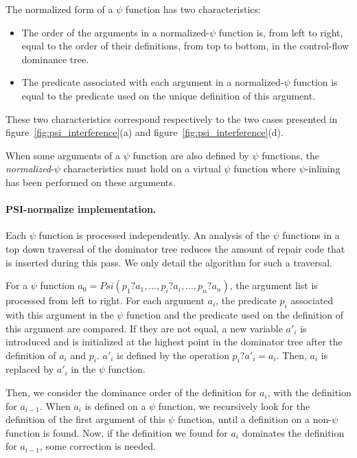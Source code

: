 The normalized form of a $\psi$ function has two characteristics:

\begin{itemize}
\item The order of the arguments in a normalized-$\psi$ function is,
from left to right, equal to the order of their definitions, from top
to bottom, in the control-flow dominance tree.
\item The predicate associated with each argument in a
normalized-$\psi$ function is equal to the predicate used on the
unique definition of this argument.
\end{itemize}

These two characteristics correspond respectively to the two cases
presented in figure~\ref{fig:psi_interference}(a) and
figure~\ref{fig:psi_interference}(d).

When some arguments of a $\psi$ function are also defined by $\psi$
functions, the {\em normalized}-$\psi$ characteristics must hold on a
virtual $\psi$ function where $\psi$-inlining has been performed on
these arguments.

\paragraph{PSI-normalize implementation.}

Each $\psi$ function is processed independently. An analysis of the
$\psi$ functions in a top down traversal of the dominator tree
reduces the amount of repair code that is inserted during this pass. We
only detail the algorithm for such a traversal.

For a $\psi$ function ${a_0 = Psi(p_1?a_1, ..., p_i?a_i, ...,
  p_n?a_n)}$, the argument list is processed from left to right. For
each argument ${a_i}$, the predicate ${p_i}$ associated with this argument
in the $\psi$ function and the predicate used on the definition of
this argument are compared. If they are not equal, a new variable
${a'_i}$ is introduced and is initialized at the highest point in the
dominator tree after the definition of ${a_i}$ and ${p_i}$. ${a'_i}$ is
defined by the operation ${p_i? a'_i = a_i}$. Then, ${a_i}$ is
replaced by ${a'_i}$ in the $\psi$ function.

Then, we consider the dominance order of the definition for ${a_i}$,
with the definition for ${a_{i-1}}$. When ${a_i}$ is defined on a
$\psi$ function, we recursively look for the definition of the first
argument of this $\psi$ function, until a definition on a non-$\psi$
function is found. Now, if the definition we found for ${a_i}$
dominates the definition for ${a_{i-1}}$, some correction is needed.

